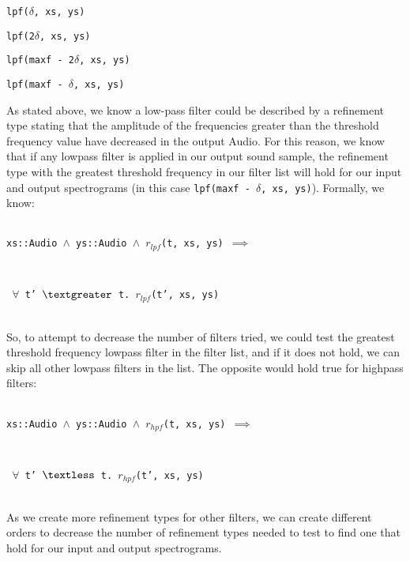 \documentclass[english, 11pt]{article}
\begin{document}
\begin{enumerate}
{\setlength\itemindent{137pt} \item{\texttt{lpf($\delta$, xs, ys)}}}
{\setlength\itemindent{137pt} \item{\texttt{lpf(2$\delta$, xs, ys)}}}
\end{enumerate}
\centerline{\bm{$\vdots$}} 
\begin{enumerate}[resume]
{\setlength\itemindent{137pt} \item{\texttt{lpf(maxf - 2$\delta$, xs, ys)}}}
{\setlength\itemindent{137pt} \item{\texttt{lpf(maxf - $\delta$, xs, ys)}}}
\end{enumerate}
As stated above, we know a low-pass filter could be described by a refinement type stating that the amplitude of the frequencies greater than the threshold frequency value have decreased in the output Audio. For this reason, we know that if any lowpass filter is applied in our output sound sample, the refinement type with the greatest threshold frequency in our filter list will hold for our input and output spectrograms (in this case \texttt{lpf(maxf - $\delta$, xs, ys)}). Formally, we know: \\ \\
\centerline{\texttt{xs::Audio $\land$ ys::Audio $\land$ $r_{lpf}$(t, xs, ys) $\implies$}} \\
\centerline{\texttt{ $\forall$ t' $\textgreater$ t. $r_{lpf}$(t', xs, ys)}} ~\\
So, to attempt to decrease the number of filters tried, we could test the greatest threshold frequency lowpass filter in the filter list, and if it does not hold, we can skip all other lowpass filters in the list. The opposite would hold true for highpass filters: \\ \\
\centerline{\texttt{xs::Audio $\land$ ys::Audio $\land$ $r_{hpf}$(t, xs, ys) $\implies$}}\\
\centerline{\texttt{ $\forall$ t' $\textless$ t. $r_{hpf}$(t', xs, ys)}} ~\\
As we create more refinement types for other filters, we can create different orders to decrease the number of refinement types needed to test to find one that hold for our input and output spectrograms. \\ \\
\end{document}
